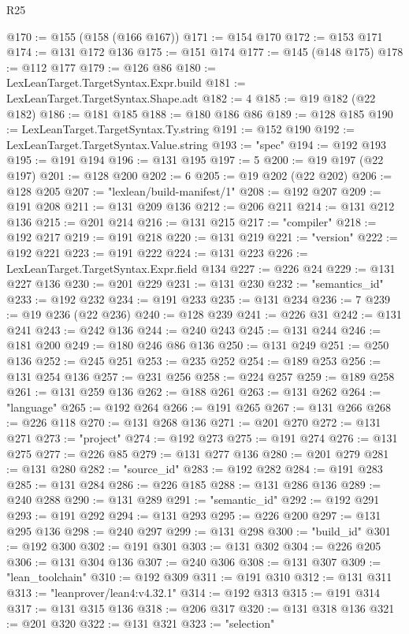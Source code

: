 \begin{lexlean}{R25}
\begin{coremodule}
@170 := @155 (@158 (@166 @167))
@171 := @154 @170
@172 := @153 @171
@174 := @131 @172 @136
@175 := @151 @174
@177 := @145 (@148 @175)
@178 := @112 @177
@179 := @126 @86
@180 := LexLeanTarget.TargetSyntax.Expr.build
@181 := LexLeanTarget.TargetSyntax.Shape.adt
@182 := 4
@185 := @19 @182 (@22 @182)
@186 := @181 @185
@188 := @180 @186 @86
@189 := @128 @185
@190 := LexLeanTarget.TargetSyntax.Ty.string
@191 := @152 @190
@192 := LexLeanTarget.TargetSyntax.Value.string
@193 := "spec"
@194 := @192 @193
@195 := @191 @194
@196 := @131 @195
@197 := 5
@200 := @19 @197 (@22 @197)
@201 := @128 @200
@202 := 6
@205 := @19 @202 (@22 @202)
@206 := @128 @205
@207 := "lexlean/build-manifest/1"
@208 := @192 @207
@209 := @191 @208
@211 := @131 @209 @136
@212 := @206 @211
@214 := @131 @212 @136
@215 := @201 @214
@216 := @131 @215
@217 := "compiler"
@218 := @192 @217
@219 := @191 @218
@220 := @131 @219
@221 := "version"
@222 := @192 @221
@223 := @191 @222
@224 := @131 @223
@226 := LexLeanTarget.TargetSyntax.Expr.field @134
@227 := @226 @24
@229 := @131 @227 @136
@230 := @201 @229
@231 := @131 @230
@232 := "semantics_id"
@233 := @192 @232
@234 := @191 @233
@235 := @131 @234
@236 := 7
@239 := @19 @236 (@22 @236)
@240 := @128 @239
@241 := @226 @31
@242 := @131 @241
@243 := @242 @136
@244 := @240 @243
@245 := @131 @244
@246 := @181 @200
@249 := @180 @246 @86 @136
@250 := @131 @249
@251 := @250 @136
@252 := @245 @251
@253 := @235 @252
@254 := @189 @253
@256 := @131 @254 @136
@257 := @231 @256
@258 := @224 @257
@259 := @189 @258
@261 := @131 @259 @136
@262 := @188 @261
@263 := @131 @262
@264 := "language"
@265 := @192 @264
@266 := @191 @265
@267 := @131 @266
@268 := @226 @118
@270 := @131 @268 @136
@271 := @201 @270
@272 := @131 @271
@273 := "project"
@274 := @192 @273
@275 := @191 @274
@276 := @131 @275
@277 := @226 @85
@279 := @131 @277 @136
@280 := @201 @279
@281 := @131 @280
@282 := "source_id"
@283 := @192 @282
@284 := @191 @283
@285 := @131 @284
@286 := @226 @185
@288 := @131 @286 @136
@289 := @240 @288
@290 := @131 @289
@291 := "semantic_id"
@292 := @192 @291
@293 := @191 @292
@294 := @131 @293
@295 := @226 @200
@297 := @131 @295 @136
@298 := @240 @297
@299 := @131 @298
@300 := "build_id"
@301 := @192 @300
@302 := @191 @301
@303 := @131 @302
@304 := @226 @205
@306 := @131 @304 @136
@307 := @240 @306
@308 := @131 @307
@309 := "lean_toolchain"
@310 := @192 @309
@311 := @191 @310
@312 := @131 @311
@313 := "leanprover/lean4:v4.32.1"
@314 := @192 @313
@315 := @191 @314
@317 := @131 @315 @136
@318 := @206 @317
@320 := @131 @318 @136
@321 := @201 @320
@322 := @131 @321
@323 := "selection"

\end{coremodule}
\end{lexlean}
